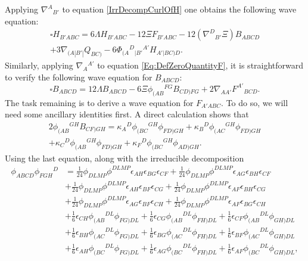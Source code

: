 \documentclass[10pt,a4paper]{article}
\theoremstyle{plain}
\begin{document}
Applying $\nabla^A{}_{B'}$ to equation \eqref{IrrDecompCurlOfH} one
obtains the following wave equation:
\begin{multline}
    \square H_{B'ABC} = 6 \Lambda H_{B'ABC} - 12 \Xi F_{B'ABC} -
    12(\nabla^{D}{}_{B'}\Xi) B_{ABCD} \\+ 3\nabla_{(A|B'|}Q_{BC)} - 6
    \Phi_{(A}{}^{D}{}_{|B'}{}^{A'}H_{A'|BC)D}. \label{Eq:WaveEqForH}
\end{multline}
Similarly, applying $\nabla_A{}^{A'}$ to equation
\eqref{Eq:DefZeroQuantityF}, it is straightforward to verify the
following wave equation for $B_{ABCD}$:
\begin{equation}
     \square B_{ABCD} = 12\Lambda B_{ABCD} - 6\Xi
     \phi_{(AB}{}^{FG}B_{CD)FG} +
     2\nabla_{AA'}F^{A'}{}_{BCD}. \label{Eq:FirstWaveEqForB}
\end{equation}
The task remaining is to derive a wave equation for $F_{A'ABC}$.  To
do so, we will need some ancillary identities first.  A direct
calculation shows that
\begin{multline}
2\phi_{(AB}{}^{GH}B_{CF)GH}=
\kappa_A{}^D\phi_{(BC}{}^{GH}\phi_{FD)GH}+\kappa_B{}^D\phi_{(AC}{}^{GH}\phi_{FD)GH}
\\+\kappa_C{}^D\phi_{(AB}{}^{GH}\phi_{FD)GH}+\kappa_F{}^D\phi_{(BC}{}^{GH}\phi_{AD)GH}.
\label{Eq:UsefulIdentity1}
 \end{multline}
Using the last equation, along with the irreducible decomposition
\begin{align*}
\phi_{ABCD} \phi_{FGH}{}^{D} &= \tfrac{1}{24} \phi_{DLMP} \phi^{DLMP}
\epsilon_{AH} \epsilon_{BG} \epsilon_{CF} + \tfrac{1}{24} \phi_{DLMP}
\phi^{DLMP} \epsilon_{AG} \epsilon_{BH} \epsilon_{CF} \\ & +
\tfrac{1}{24} \phi_{DLMP} \phi^{DLMP} \epsilon_{AH} \epsilon_{BF}
\epsilon_{CG} + \tfrac{1}{24} \phi_{DLMP} \phi^{DLMP} \epsilon_{AF}
\epsilon_{BH} \epsilon_{CG} \\ &+ \tfrac{1}{24} \phi_{DLMP}
\phi^{DLMP} \epsilon_{AG} \epsilon_{BF} \epsilon_{CH} + \tfrac{1}{24}
\phi_{DLMP} \phi^{DLMP} \epsilon_{AF} \epsilon_{BG} \epsilon_{CH}
\\ &+ \tfrac{1}{6} \epsilon_{CH} \phi_{(AB}{}^{DL}\phi_{FG)DL} +
\tfrac{1}{6} \epsilon_{CG} \phi_{(AB}{}^{DL}\phi_{FH)DL} +
\tfrac{1}{6} \epsilon_{CF} \phi_{(AB}{}^{DL}\phi_{GH)DL}\\ & +
\tfrac{1}{6} \epsilon_{BH} \phi_{(AC}{}^{DL}\phi_{FG)DL} +
\tfrac{1}{6} \epsilon_{BG} \phi_{(AC}{}^{DL}\phi_{FH)DL} +
\tfrac{1}{6} \epsilon_{BF} \phi_{(AC}{}^{DL}\phi_{GH)DL}\\ &+
\tfrac{1}{6} \epsilon_{AH} \phi_{(BC}{}^{DL}\phi_{FG)DL} +
\tfrac{1}{6} \epsilon_{AG} \phi_{(BC}{}^{DL}\phi_{FH)DL} +
\tfrac{1}{6} \epsilon_{AF} \phi_{(BC}{}^{DL}\phi_{GH)DL},
\end{align*}
\end{document}

